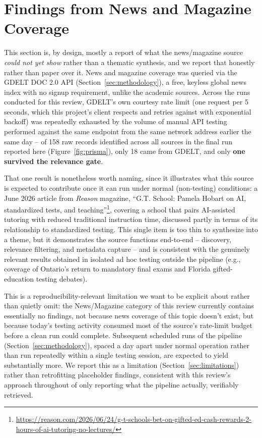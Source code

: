 \documentclass[11pt]{article}
\begin{document}
\section{Findings from News and Magazine Coverage}
\label{sec:findings-news}

This section is, by design, mostly a report of what the news/magazine source \emph{could not yet show} rather than a thematic synthesis, and we report that honestly rather than paper over it. News and magazine coverage was queried via the GDELT DOC 2.0 API (Section~\ref{sec:methodology}), a free, keyless global news index with no signup requirement, unlike the academic sources. Across the runs conducted for this review, GDELT's own courtesy rate limit (one request per 5 seconds, which this project's client respects and retries against with exponential backoff) was repeatedly exhausted by the volume of manual API testing performed against the same endpoint from the same network address earlier the same day -- of 158 raw records identified across all sources in the final run reported here (Figure~\ref{fig:prisma}), only 18 came from GDELT, and only \textbf{one survived the relevance gate}.

That one result is nonetheless worth naming, since it illustrates what this source is expected to contribute once it can run under normal (non-testing) conditions: a June 2026 article from \emph{Reason} magazine, ``G.T. School: Pamela Hobart on AI, standardized tests, and teaching''\footnote{\url{https://reason.com/2026/06/24/g-t-schools-bet-on-gifted-ed-cash-rewards-2-hours-of-ai-tutoring-no-lectures/}}, covering a school that pairs AI-assisted tutoring with reduced traditional instruction time, discussed partly in terms of its relationship to standardized testing. This single item is too thin to synthesize into a theme, but it demonstrates the source functions end-to-end -- discovery, relevance filtering, and metadata capture -- and is consistent with the genuinely relevant results obtained in isolated ad hoc testing outside the pipeline (e.g., coverage of Ontario's return to mandatory final exams and Florida gifted-education testing debates).

This is a reproducibility-relevant limitation we want to be explicit about rather than quietly omit: the News/Magazine category of this review currently contains essentially no findings, not because news coverage of this topic doesn't exist, but because today's testing activity consumed most of the source's rate-limit budget before a clean run could complete. Subsequent scheduled runs of the pipeline (Section~\ref{sec:methodology}), spaced a day apart under normal operation rather than run repeatedly within a single testing session, are expected to yield substantially more. We report this as a limitation (Section~\ref{sec:limitations}) rather than retrofitting placeholder findings, consistent with this review's approach throughout of only reporting what the pipeline actually, verifiably retrieved.
\end{document}
